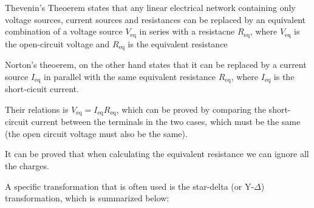 \documentclass[english,a4paper,12pt]{report}
\begin{document}
Thevenin's Theoerem states that any linear electrical network containing only voltage sources, current sources and resistances can be replaced by an equivalent combination of a voltage source \(V_{\text{eq} } \) in series with a resistacne \(R_{\text{eq} } \), where \(V_{\text{eq} } \) is the open-circuit voltage and \(R_{\text{eq} } \) is the equivalent resistance

Norton's theoerem, on the other hand states that it can be replaced by a current source \(I_{\text{eq} } \) in parallel with the same equivalent resistance \(R_{\text{eq} } \), where \(I_{\text{eq} } \) is the short-cicuit current.

Their relations is \(V_{\text{eq} } = I_{\text{eq} }R_{\text{eq} }\), which can be proved by comparing the short-circuit current between the terminals in the two cases, which must be the same (the open circuit voltage must also be the same). 

It can be proved that when calculating the equivalent resistance we can ignore all the charges.

A specific transformation that is often used is the star-delta (or Y-\(\Delta \)) transformation, which is summarized below:

\begin{center}
\end{center}
    
\end{document}
